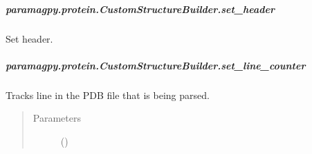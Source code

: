 \documentclass[a4paper,10pt,english,openany,oneside]{sphinxmanual}
\begin{document}
\begin{fulllineitems}
\begin{fulllineitems}
\begin{fulllineitems}
\end{fulllineitems}



\subparagraph{paramagpy.protein.CustomStructureBuilder.set\_header}
\label{\detokenize{reference/generated/paramagpy.protein.CustomStructureBuilder.set_header:paramagpy-protein-customstructurebuilder-set-header}}\label{\detokenize{reference/generated/paramagpy.protein.CustomStructureBuilder.set_header::doc}}

\begin{fulllineitems}
\label{\detokenize{reference/generated/paramagpy.protein.CustomStructureBuilder.set_header:paramagpy.protein.CustomStructureBuilder.set_header}}
\sphinxAtStartPar
Set header.

\end{fulllineitems}



\subparagraph{paramagpy.protein.CustomStructureBuilder.set\_line\_counter}
\label{\detokenize{reference/generated/paramagpy.protein.CustomStructureBuilder.set_line_counter:paramagpy-protein-customstructurebuilder-set-line-counter}}\label{\detokenize{reference/generated/paramagpy.protein.CustomStructureBuilder.set_line_counter::doc}}

\begin{fulllineitems}
\label{\detokenize{reference/generated/paramagpy.protein.CustomStructureBuilder.set_line_counter:paramagpy.protein.CustomStructureBuilder.set_line_counter}}
\sphinxAtStartPar
Tracks line in the PDB file that is being parsed.
\begin{quote}\begin{description}
\item[{Parameters}] \leavevmode
\sphinxAtStartPar
{} () \textendash{} 


\end{description}
\end{quote}
\end{fulllineitems}
\end{fulllineitems}
\end{fulllineitems}
\end{document}
